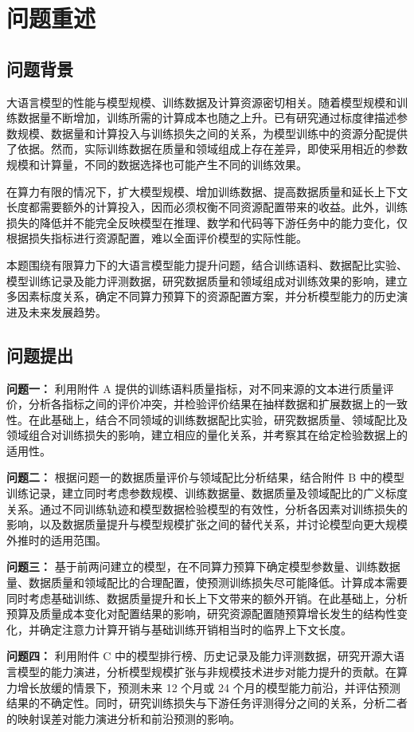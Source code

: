\section{问题重述}

\subsection{问题背景}

大语言模型的性能与模型规模、训练数据及计算资源密切相关。随着模型规模和训练数据量不断增加，训练所需的计算成本也随之上升。已有研究通过标度律描述参数规模、数据量和计算投入与训练损失之间的关系，为模型训练中的资源分配提供了依据。然而，实际训练数据在质量和领域组成上存在差异，即使采用相近的参数规模和计算量，不同的数据选择也可能产生不同的训练效果。

在算力有限的情况下，扩大模型规模、增加训练数据、提高数据质量和延长上下文长度都需要额外的计算投入，因而必须权衡不同资源配置带来的收益。此外，训练损失的降低并不能完全反映模型在推理、数学和代码等下游任务中的能力变化，仅根据损失指标进行资源配置，难以全面评价模型的实际性能。

本题围绕有限算力下的大语言模型能力提升问题，结合训练语料、数据配比实验、模型训练记录及能力评测数据，研究数据质量和领域组成对训练效果的影响，建立多因素标度关系，确定不同算力预算下的资源配置方案，并分析模型能力的历史演进及未来发展趋势。

\subsection{问题提出}

\textbf{问题一：}
利用附件 A 提供的训练语料质量指标，对不同来源的文本进行质量评价，分析各指标之间的评价冲突，并检验评价结果在抽样数据和扩展数据上的一致性。在此基础上，结合不同领域的训练数据配比实验，研究数据质量、领域配比及领域组合对训练损失的影响，建立相应的量化关系，并考察其在给定检验数据上的适用性。

\textbf{问题二：}
根据问题一的数据质量评价与领域配比分析结果，结合附件 B 中的模型训练记录，建立同时考虑参数规模、训练数据量、数据质量及领域配比的广义标度关系。通过不同训练轨迹和模型数据检验模型的有效性，分析各因素对训练损失的影响，以及数据质量提升与模型规模扩张之间的替代关系，并讨论模型向更大规模外推时的适用范围。

\textbf{问题三：}
基于前两问建立的模型，在不同算力预算下确定模型参数量、训练数据量、数据质量和领域配比的合理配置，使预测训练损失尽可能降低。计算成本需要同时考虑基础训练、数据质量提升和长上下文带来的额外开销。在此基础上，分析预算及质量成本变化对配置结果的影响，研究资源配置随预算增长发生的结构性变化，并确定注意力计算开销与基础训练开销相当时的临界上下文长度。

\textbf{问题四：}
利用附件 C 中的模型排行榜、历史记录及能力评测数据，研究开源大语言模型的能力演进，分析模型规模扩张与非规模技术进步对能力提升的贡献。在算力增长放缓的情景下，预测未来 12 个月或 24 个月的模型能力前沿，并评估预测结果的不确定性。同时，研究训练损失与下游任务评测得分之间的关系，分析二者的映射误差对能力演进分析和前沿预测的影响。
